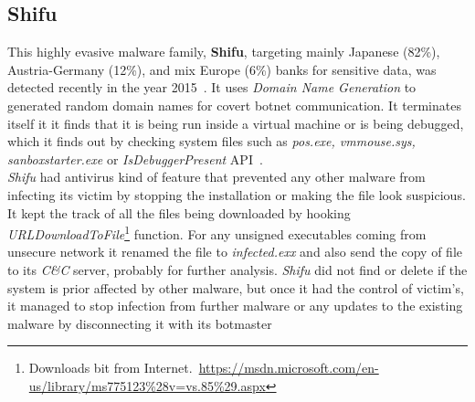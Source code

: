 \subsection{Shifu}
\label{sub:Shifu}
This highly evasive malware family, \textbf{Shifu}, targeting mainly Japanese (82\%), Austria-Germany (12\%), and mix Europe (6\%) banks for sensitive data, was detected recently in the year 2015~\cite[]{secintelshifu}.
It uses \emph{Domain Name Generation} to generated random domain names for covert botnet communication.
It terminates itself it it finds that it is being run inside a virtual machine or is being debugged, which it finds out by checking system files such as \emph{pos.exe, vmmouse.sys, sanboxstarter.exe} or \emph{IsDebuggerPresent} API~\cite[]{mccafeshifu}.\\
\emph{Shifu} had antivirus kind of feature that prevented any other malware from infecting its victim by stopping the installation or making the file look suspicious.
It kept the track of all the files being downloaded by hooking \textit{URLDownloadToFile}\footnote{Downloads bit from Internet.\ \url{https://msdn.microsoft.com/en-us/library/ms775123\%28v=vs.85\%29.aspx}} function.
For any unsigned executables coming from unsecure network it renamed the file to \emph{infected.exx} and also send the copy of file to its \emph{C\&C} server, probably for further analysis.
\emph{Shifu} did not find or delete if the system is prior affected by other malware, but once it had the control of victim's, it managed to stop infection from further malware or any updates to the existing malware by disconnecting it with its botmaster~\cite[]{secintelshifu} 

